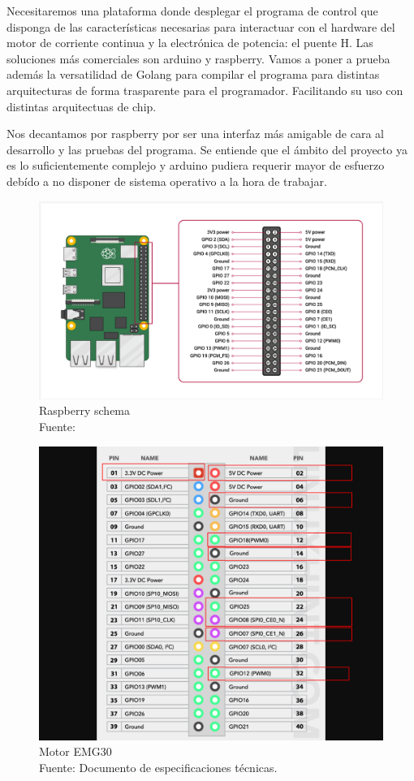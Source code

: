 Necesitaremos una plataforma donde desplegar el programa de control que disponga de las características necesarias para interactuar con el hardware del  motor de corriente continua y la electrónica de potencia: el puente H. Las soluciones más comerciales son arduino y raspberry. Vamos a poner a prueba además la versatilidad de Golang para compilar el programa para distintas arquitecturas de forma trasparente para el programador. Facilitando su uso con distintas arquitectuas de chip.

Nos decantamos por raspberry por ser una interfaz más amigable de cara al desarrollo y las pruebas del programa. Se entiende que el ámbito del proyecto ya es lo suficientemente complejo y arduino pudiera requerir mayor de esfuerzo debído a no disponer de sistema operativo a la hora de trabajar.

\begin{figure}[H]
    \centering
    \includegraphics[scale = 0.4]{part/Proyecto_ejecutivo/memoria_constructiva/raspb/img/raspberry}
    \caption[Rasberry schema]{Raspberry schema \\Fuente: }\label{fig:raspberry pins}
\end{figure}

\begin{figure}[H]
    \centering
    \includegraphics[scale = 0.4]{part/Proyecto_ejecutivo/memoria_constructiva/raspb/img/gpio-pinout-raspberry-pi-01-used}
    \caption[Motor EMG30]{Motor EMG30 \\Fuente: Documento de especificaciones técnicas.}\label{fig:Used Pins}
\end{figure}